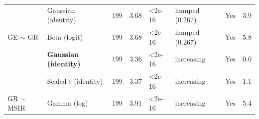 \begin{table}[H]
{\begin{tabular}[t]{llrrllll}
\cmidrule{2-8}
 & Gaussian (identity) & 199 & 3.68 & <2e-16 & humped (0.267) & Yes & 3.9\\
\cmidrule{2-8}
\multirow{-3}{*}{\raggedright\arraybackslash GE $\sim$ GR} & Beta (logit) & 199 & 3.68 & <2e-16 & humped (0.267) & Yes & 5.8\\
\cmidrule{1-8}
 & \textbf{Gaussian (identity)} & 199 & 3.36 & <2e-16 & increasing & Yes & 0.0\\
\cmidrule{2-8}
 & Scaled t (identity) & 199 & 3.37 & <2e-16 & increasing & Yes & 1.1\\
\cmidrule{2-8}
\multirow{-3}{*}{\raggedright\arraybackslash GR $\sim$ MSIR} & Gamma (log) & 199 & 3.91 & <2e-16 & increasing & Yes & 5.4\\
\bottomrule
\end{tabular}}
\end{table}
